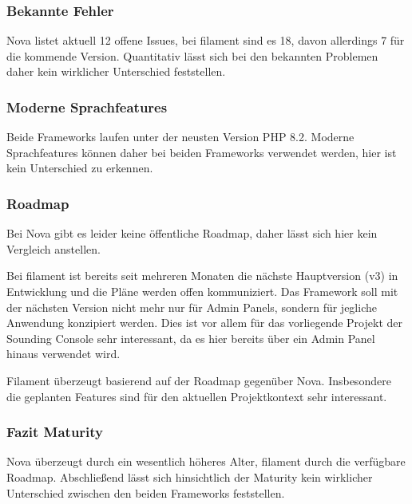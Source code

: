 \subsubsection{Bekannte Fehler}
Nova listet aktuell 12 offene Issues, bei filament sind es 18, davon allerdings 7 für die kommende Version.
Quantitativ lässt sich bei den bekannten Problemen daher kein wirklicher Unterschied feststellen.

\subsubsection{Moderne Sprachfeatures}
Beide Frameworks laufen unter der neusten Version PHP 8.2.
Moderne Sprachfeatures können daher bei beiden Frameworks verwendet werden, hier ist kein Unterschied zu erkennen.

\subsubsection{Roadmap}
Bei Nova gibt es leider keine öffentliche Roadmap, daher lässt sich hier kein Vergleich anstellen.

Bei filament ist bereits seit mehreren Monaten die nächste Hauptversion (v3) in Entwicklung\cite{filament-v3-plans} und die Pläne werden offen kommuniziert.
Das Framework soll mit der nächsten Version nicht mehr nur für Admin Panels, sondern für jegliche Anwendung konzipiert werden\cite{filament-v3}.
Dies ist vor allem für das vorliegende Projekt der Sounding Console sehr interessant, da es hier bereits über ein Admin Panel hinaus verwendet wird.

Filament überzeugt basierend auf der Roadmap gegenüber Nova.
Insbesondere die geplanten Features sind für den aktuellen Projektkontext sehr interessant.

\subsubsection{Fazit Maturity}
Nova überzeugt durch ein wesentlich höheres Alter, filament durch die verfügbare Roadmap.
Abschließend lässt sich hinsichtlich der Maturity kein wirklicher Unterschied zwischen den beiden Frameworks feststellen.
